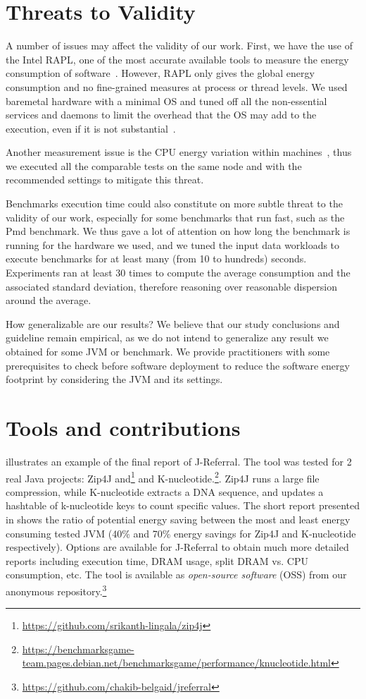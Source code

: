 \section{Threats to Validity}\label{sec:threats}
A number of issues may affect the validity of our work.
First, we have the use of the Intel RAPL, one of the most accurate available tools to measure the energy consumption of software~\cite{Khan:2018:RAE:3199681.3177754,10.1145/2989081.2989088}.
However, RAPL only gives the global energy consumption and no fine-grained measures at process or thread levels.
We used baremetal hardware with a minimal OS and tuned off all the non-essential services and daemons to limit the overhead that the OS may add to the execution, even if it is not substantial~\cite{opaper}.

Another measurement issue is the CPU energy variation within machines~\cite{opaper}, thus we executed all the comparable tests on the same node and with the recommended settings to mitigate this threat.

Benchmarks execution time could also constitute on more subtle threat to the validity of our work, especially for some benchmarks that run fast, such as the \textsf{Pmd} benchmark.
We thus gave a lot of attention on how long the benchmark is running for the hardware we used, and we tuned the input data workloads to execute benchmarks for at least many (from 10 to hundreds) seconds.
Experiments ran at least 30 times to compute the average consumption and the associated standard deviation, therefore reasoning over reasonable dispersion around the average.

How generalizable are our results? We believe that our study conclusions and guideline remain empirical, as we do not intend to generalize any result we obtained for some JVM or benchmark.
We provide practitioners with some prerequisites to check before software deployment to reduce the software energy footprint by considering the JVM and its settings.


\section{Tools and contributions}
 illustrates an example of the final report of \textsf{J-Referral}.
The tool was tested for 2 real Java projects: \textsf{Zip4J} and\footnote{\url{https://github.com/srikanth-lingala/zip4j}} and \textsf{K-nucleotide}.\footnote{\url{https://benchmarksgame-team.pages.debian.net/benchmarksgame/performance/knucleotide.html}}.
\textsf{Zip4J} runs a large file compression, while \textsf{K-nucleotide}  extracts a DNA sequence, and updates a hashtable of k-nucleotide keys to count specific values.
The short report presented in  shows the ratio of potential energy saving between the most and least energy consuming tested JVM (40\% and 70\% energy savings for \textsf{Zip4J} and \textsf{K-nucleotide} respectively).
Options are available for \textsf{J-Referral} to obtain much more detailed reports including execution time, DRAM usage, split DRAM vs. CPU consumption, etc.
The tool is available as \emph{open-source software} (OSS) from our anonymous repository.\footnote{\url{https://github.com/chakib-belgaid/jreferral}}

